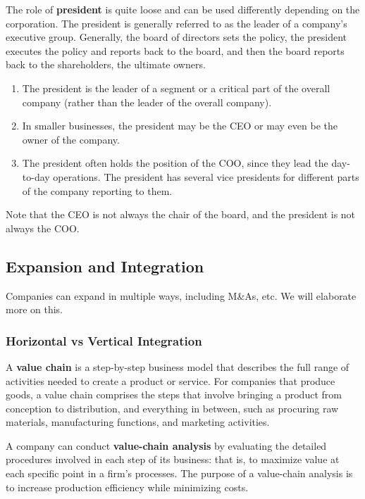 \documentclass{article}
\begin{document}
    \begin{definition}[President]
      The role of \textbf{president} is quite loose and can be used differently depending on the corporation. The president is generally referred to as the leader of a company's executive group. Generally, the board of directors sets the policy, the president executes the policy and reports back to the board, and then the board reports back to the shareholders, the ultimate owners. 
      \begin{enumerate}
          \item The president is the leader of a segment or a critical part of the overall company (rather than the leader of the overall company). 
          \item In smaller businesses, the president may be the CEO or may even be the owner of the company. 
          \item The president often holds the position of the COO, since they lead the day-to-day operations. The president has several vice presidents for different parts of the company reporting to them. 
      \end{enumerate}
    \end{definition}

    Note that the CEO is not always the chair of the board, and the president is not always the COO. 

  \subsection{Expansion and Integration}

    Companies can expand in multiple ways, including M\&As, etc. We will elaborate more on this. 

    \subsubsection{Horizontal vs Vertical Integration}

      \begin{definition}
        A \textbf{value chain} is a step-by-step business model that describes the full range of activities needed to create a product or service. For companies that produce goods, a value chain comprises the steps that involve bringing a product from conception to distribution, and everything in between, such as procuring raw materials, manufacturing functions, and marketing activities. 

        A company can conduct \textbf{value-chain analysis} by evaluating the detailed procedures involved in each step of its business: that is, to maximize value at each specific point in a firm's processes. The purpose of a value-chain analysis is to increase production efficiency while minimizing costs. 
      \end{definition}
\end{document}
